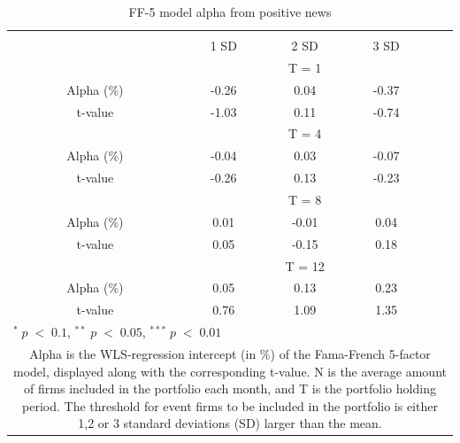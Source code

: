 \setlength{\tabcolsep}{15pt}
\begin{table}[H]
\small
\centering
\caption{FF-5 model alpha from positive news } 
\begin{tabular}{ccccccc}
\hline \hline \\ 
 &     &  &    1 SD  &  2 SD  &  3 SD  &  \\ \cline{4-6} 
& & & \multicolumn{3}{c}{ T = 1} & \\ \cline{2-6}
& Alpha (\%)  &  & -0.26  & 0.04  & -0.37 &  \\
& t-value &  & -1.03 & 0.11  & -0.74 & \\
& & & \multicolumn{3}{c}{ T = 4} & \\ \cline{2-6}
& Alpha (\%)  &  & -0.04  & 0.03  &  -0.07 & \\
& t-value &  & -0.26 & 0.13  & -0.23 & \\
& & & \multicolumn{3}{c}{ T = 8} & \\ \cline{2-6}
& Alpha (\%)  &  & 0.01   & -0.01  & 0.04 &  \\
& t-value &  & 0.05  & -0.15 & 0.18 & \\
&  & & \multicolumn{3}{c}{ T = 12} & \\ \cline{2-6}
& Alpha (\%)  &  & 0.05  & 0.13  & 0.23 &  \\
& t-value &  & 0.76  & 1.09 & 1.35 & \\
 \hline \hline
 \multicolumn{7}{l}{ \footnotesize $^* \; p\; <\; 0.1$, $ ^{**} \; p\; <\; 0.05$, $ ^{***} \; p\; <\; 0.01$  } \\
 \multicolumn{7}{p{11.5cm}}{ \footnotesize Alpha is the WLS-regression intercept (in \%) of the Fama-French 5-factor model, displayed along with the corresponding t-value. N is the average amount of firms included in the portfolio each month, and T is the portfolio holding period. The threshold for event firms to be included in the portfolio is either 1,2 or 3 standard deviations (SD) larger than the mean.}  \\ 
\end{tabular}
\label{tab: FF5_pos}
\end{table}

